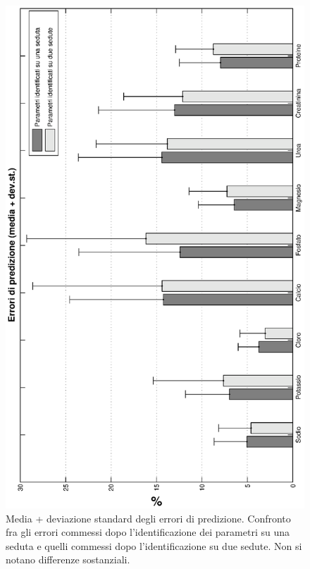 \begin{figure}[!htb]
\centering
		\includegraphics[angle=-90, width=\textwidth]{immagini/pred_1vs2.eps}
				\caption{Media + deviazione standard degli errori di predizione. Confronto fra gli errori commessi dopo l'identificazione dei parametri su una seduta e quelli commessi dopo l'identificazione su due sedute. Non si notano differenze sostanziali.}\label{fig:pred_1vs2}
\end{figure}

